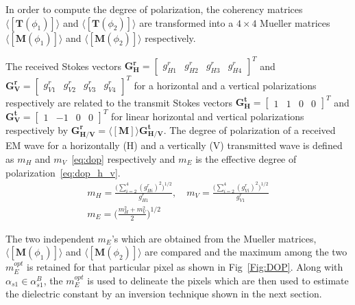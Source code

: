 In order to compute the degree of polarization, the coherency matrices $\langle[{\mathbf{T}}(\phi_1)]\rangle$ and $\langle[{\mathbf{T}}(\phi_2)]\rangle$ are transformed into a $4\times4$ Mueller matrices $\langle[{\mathbf{M}}(\phi_1)]\rangle$ and $\langle[{\mathbf{M}}(\phi_2)]\rangle$ respectively. 

The received Stokes vectors $\mathbf{G_{H}^{r}}=\begin{bmatrix} g_{H1}^{r} & g_{H2}^{r} & g_{H3}^{r} & g_{H4}^{r}
\end{bmatrix}^{T}$ and $\mathbf{G_{V}^{r}}=\begin{bmatrix}
g_{V1}^{r} & g_{V2}^{r} & g_{V3}^{r} & g_{V4}^{r}
\end{bmatrix}^T$ for a horizontal and a vertical  polarizations respectively are related to the
transmit Stokes vectors $\mathbf{G_{H}^{t}} = \begin{bmatrix}
1 & 1 & 0 & 0
\end{bmatrix}^T$ and $\mathbf{G_{V}^{t}} = \begin{bmatrix}
1 & {-1} & 0 & 0
\end{bmatrix}^T$ for linear horizontal and vertical polarizations respectively by $\mathbf{G_{H/V}^{r}}=\mathbf{\langle[M]\rangle}\mathbf{G_{H/V}^{t}}$. The degree of polarization of a received EM wave for a horizontally (H) and a vertically (V) transmitted wave is defined as $m_{H}$ and $m_{V}$~\eqref{eq:dop} respectively and $m_{E}$ is the effective degree of polarization~\eqref{eq:dop_h_v}.
\begin{gather}
m_{H} = \frac{\Big(\sum_{i=2}^{4}({g_{Hi}^{r}})^2 \Big)^{1/2}}{g_{H1}^{r}},\quad\label{eq:dop}
m_{V} = \frac{\Big(\sum_{i=2}^{4}({g_{Vi}^{r}})^2 \Big)^{1/2}}{g_{V1}^{r}}\\[0.1em] 
m_{E} = \Bigg(\frac{m_{H}^{2}+m_{V}^{2}}{2}\Bigg)^{1/2}
\label{eq:dop_h_v}
\end{gather}

The two independent $m_{E}$'s which are obtained from the Mueller matrices, $\langle[{\mathbf{M}}(\phi_1)]\rangle$ and $\langle[{\mathbf{M}}(\phi_2)]\rangle$ are compared and the maximum among the two $m_{E}^{opt}$ is retained for that particular pixel as shown in Fig~\ref{Fig:DOP}. Along with $\alpha_{s1} \in \alpha_{s1}^{B}$, the $m_{E}^{opt}$ is used to delineate the pixels which are then used to estimate the dielectric constant by an inversion technique shown in the next section.

